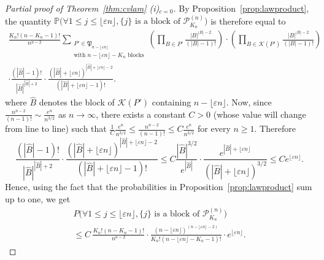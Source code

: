 \documentclass[AHL,XML,longabstracts,Unicode]{cedram}
\renewcommand{\P}{\mathbb{P}}
\def\PPP{\mathcal P}
\renewcommand{\epsilon}{\varepsilon}
\begin{document}
\begin{proof}[Partial proof of Theorem~\ref{thm:cvlam} (i)$_{c=0}$]
By  Proposition~\ref{prop:lawproduct}, the quantity $\P \big( \forall 1 \leq j \leq \lfloor \epsilon n \rfloor, \{j\} \textrm{ is a block of } \PPP^{(n)}_{K_{n}}  \big)$ is therefore equal to
\begin{multline*}
  \frac{K_{n}! (n-K_{n}-1)!}{n^{n-2}}  \sum_{\substack{P' \in \mathfrak{P}_{n- \lfloor \epsilon n \rfloor} \\  \textrm{with } n- \lfloor \epsilon n \rfloor-K_{n} \textrm{ blocks}}}  \left( \prod_{B \in P'} \frac{|B|^{|B|-2}}{(|B|-1)!} \right) \cdot \left(  \prod_{B \in  \mathcal{K}(P')} \frac{|B|^{|B|-2}}{(|B|-1)!} \right) \\
  \cdot  \frac{(|\hat{B}|-1)!}{|\hat{B}|^{|\hat{B}|+2}} \cdot\frac{(|\hat{B}|+\lfloor \epsilon n \rfloor)^{|\hat{B}|+\lfloor \epsilon n \rfloor-2}}{(|\hat{B}|+\lfloor \epsilon n \rfloor-1)!}.
\end{multline*}
where $\hat{B}$ denotes the block of $\mathcal{K}(P')$ containing $n- \lfloor \epsilon n \rfloor$. Now, since $ \frac{n^{n-2}}{(n-1)!} \sim  \tfrac{e^{n}}{n^{3/2}}$ as $ n \rightarrow \infty$, there exists a constant $C>0$ (whose value will change from line to line) such that $ \tfrac{1}{C}  \tfrac{e^{n}}{n^{3/2}} \leq  \frac{n^{n-2}}{(n-1)!}  \leq C  \tfrac{e^{n}}{n^{3/2}}$ for every $n \geq 1$.  Therefore
\[
 \frac{(|\hat{B}|-1)!}{|\hat{B}|^{|\hat{B}|+2}} \cdot\frac{(|\hat{B}|+\lfloor \epsilon n \rfloor)^{|\hat{B}|+\lfloor \epsilon n \rfloor-2}}{(|\hat{B}|+\lfloor \epsilon n \rfloor-1)!} \leq   C \frac{|\hat{B}|^{3/2}}{e^{|\hat{B}|}} \cdot  \frac{e^{|\hat{B}|+\lfloor \epsilon n \rfloor}}{(|\hat{B}|+\lfloor \epsilon n \rfloor)^{3/2}} \leq C e^{\lfloor \epsilon n \rfloor}.
\]
Hence, using the fact that the probabilities in Proposition~\ref{prop:lawproduct} sum up to one, we get
\begin{multline*}
  P \big( \forall 1 \leq j \leq \lfloor \epsilon n \rfloor, \{j\} \textrm{ is a block of } \PPP^{(n)}_{K_{n}}  \big) \\
  \leq  C  \, \frac{K_{n}! (n-K_{n}-1)!}{n^{n-2}} \cdot \frac{(n-\lfloor \epsilon n \rfloor)^{(n-\lfloor \epsilon n \rfloor-2)}}{K_{n}! (n-\lfloor \epsilon n \rfloor  -K_{n}-1)!} \cdot e^{\lfloor \epsilon n \rfloor}.
\end{multline*}


\end{proof}
\end{document}
